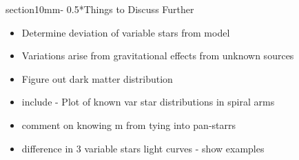 \documentclass[letterpaper,11pt]{article}
\makeatletter
\renewcommand{\section}{\@startsection%
{section}{1}{0mm}{-\baselineskip}%
{0.5\baselineskip}{\normalfont\Large\bfseries}}%
\makeatother
\begin{document}
\section*{Things to Discuss Further}

\begin{itemize}
	\item{} Determine deviation of variable stars from model
	\item{} Variations arise from gravitational effects from unknown sources
	\item{} Figure out dark matter distribution
	\item{} include - Plot of known var star distributions in spiral arms
	\item{} comment on knowing m from tying into pan-starrs
	\item{} difference in 3 variable stars light curves - show examples
\end{itemize}
\end{document}
